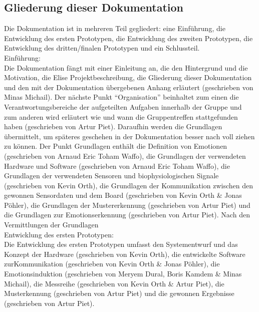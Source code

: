 \subsection{Gliederung dieser Dokumentation} \label{gliederung-subsec}


Die Dokumentation ist in mehreren Teil gegliedert: eine Einführung, die Entwicklung des ersten Prototypen, die Entwicklung des zweiten Prototypen, die Entwicklung des dritten/finalen Prototypen und ein Schlussteil. \\

Einführung: \\

Die Dokumentation fängt mit einer Einleitung an, die den Hintergrund und die Motivation, die Elise Projektbeschreibung, die Gliederung dieser Dokumentation und den mit der Dokumentation übergebenen Anhang erläutert (geschrieben von Minas Michail). 
Der nächste Punkt ``Organisation'' beinhaltet zum einen die Verantwortungsbereiche der aufgeteilten Aufgaben innerhalb der Gruppe und  zum anderen wird erläutert wie und wann die Gruppentreffen stattgefunden haben (geschrieben von Artur Piet). 
Daraufhin werden die Grundlagen übermittelt, um späteres geschehen in der Dokumentation besser nach voll ziehen zu können. 
Der Punkt Grundlagen enthält die Definition von Emotionen (geschrieben von Arnaud Eric Toham Waffo), die Grundlagen der verwendeten Hardware und Software (geschrieben von Arnaud Eric Toham Waffo), die Grundlagen der verwendeten Sensoren und biophysiologischen Signale (geschrieben von Kevin Orth), die Grundlagen der Kommunikation zwischen den gewonnen Sensordaten und dem Board (geschrieben von Kevin Orth \& Jonas Pöhler), die Grundlagen der Mustererkennung (geschrieben von Artur Piet) und die Grundlagen zur Emotionserkennung (geschrieben von Artur Piet). 
Nach den Vermittlungen der Grundlagen \\

Entwicklung des ersten Prototypen: \\

Die Entwicklung des ersten Prototypen umfasst den Systementwurf und das Konzept der Hardware (geschrieben von Kevin Orth), die entwickelte Software zurKommunikation (geschrieben von Kevin Orth \& Jonas Pöhler), die Emotionsinduktion (geschrieben von Meryem Dural, Boris Kamdem \& Minas Michail), die Messreihe (geschrieben von Kevin Orth \& Artur Piet), die Musterkennung (geschrieben von Artur Piet) und die gewonnen Ergebnisse (geschrieben von Artur Piet). \\

